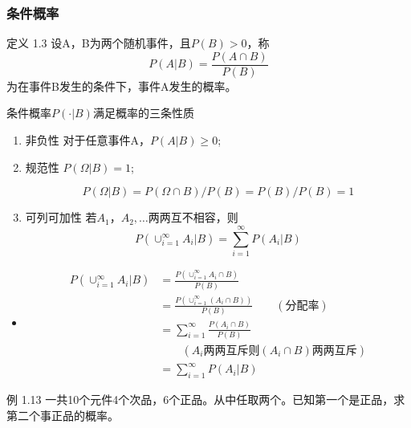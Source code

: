 \documentclass{beamer}
\begin{document}
	\begin{frame}
		\frametitle{条件概率}
		定义 1.3 设A，B为两个随机事件，且$P(B) > 0$，称
		\[
		P(A|B) = \frac{P(A \cap B)}{P(B)}
		\]
		为在事件B发生的条件下，事件A发生的概率。
		
		条件概率$P(\cdot | B)$满足概率的三条性质
		
		\begin{enumerate}
			\item 非负性 对于任意事件A，$P(A|B) \geq 0$;
			\item 规范性 $P(\Omega | B) = 1$;
			
			\[
			P(\Omega | B) = P( \Omega \cap B) / P(B) = P(B) / P(B) = 1
			\]
			\item 可列可加性 若$A_1， A_2, \dots$两两互不相容，则
			\[
			P(\cup_{i = 1}^{\infty}A_i | B) = \sum_{i = 1}^{\infty}P(A_i |B) 
			\]
		\end{enumerate}
	\end{frame}
	
	\begin{frame}
		\begin{itemize}
			\item
			\begin{align}
			P(\cup_{i = 1}^{\infty}A_i | B) &= \frac{P(\cup_{i = 1}^{\infty}A_i \cap B)}{P(B)} \\ 
			&= \frac{P(\cup_{i = 1}^{\infty}(A_i \cap B))}{P(B)} \qquad(\text{分配率})\\
			&= \sum_{i = 1}^{\infty} \frac{P(A_i \cap B)}{P(B)} \\
			&\qquad(A_i\text{两两互斥则}(A_i \cap B)\text{两两互斥})\nonumber \\
			& = \sum_{i = 1}^{\infty}P(A_i |B)
			\end{align}
		\end{itemize}
	\end{frame}
	
	\begin{frame}
		例 1.13 一共10个元件4个次品，6个正品。从中任取两个。已知第一个是正品，求第二个事正品的概率。
		
	\end{frame}
	
\end{document}
